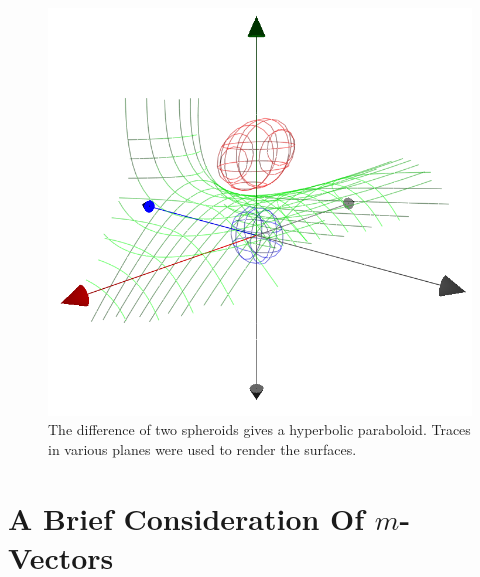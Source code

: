 \documentclass{ecgd-l}
\theoremstyle{definition}
\theoremstyle{remark}
\numberwithin{equation}{section}
\begin{document}
\begin{figure}
\includegraphics[scale=0.7]{DiffOfSpheroids}
\caption{The difference of two spheroids gives a hyperbolic paraboloid.  Traces in various planes were used to render the surfaces.}
\label{fig_diff_of_spheroids}
\end{figure}






\section{A Brief Consideration Of $m$-Vectors}
\end{document}
